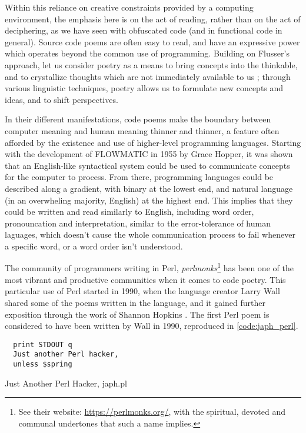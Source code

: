 Within this reliance on creative constraints provided by a computing environment, the emphasis here is on the act of reading, rather than on the act of deciphering, as we have seen with obfuscated code (and in functional code in general). Source code poems are often easy to read, and have an expressive power which operates beyond the common use of programming. Building on Flusser's approach, let us consider poetry as a means to bring concepts into the thinkable, and to crystallize thoughts which are not immediately available to us \citep{flusser_doubt_2014}; through various linguistic techniques, poetry allows us to formulate new concepts and ideas, and to shift perspectives.

In their different manifestations, code poems make the boundary between computer meaning and human meaning thinner and thinner, a feature often afforded by the existence and use of higher-level programming languages. Starting with the development of FLOWMATIC in 1955 by Grace Hopper, it was shown that an English-like syntactical system could be used to communicate concepts for the computer to process. From there, programming languages could be described along a gradient, with binary at the lowest end, and natural language (in an overwheling majority, English) at the highest end. This implies that they could be written and read similarly to English, including word order, pronouncation and interpretation, similar to the error-tolerance of human laguages, which doesn't cause the whole communication process to fail whenever a specific word, or a word order isn't understood.

The community of programmers writing in Perl, \emph{perlmonks}\footnote{See their website: \url{https://perlmonks.org/}, with the spiritual, devoted and communal undertones that such a name implies.} has been one of the most vibrant and productive communities when it comes to code poetry. This particular use of Perl started in 1990, when the language creator Larry Wall shared some of the poems written in the language, and it gained further exposition through the work of Shannon Hopkins \citep{hopkins_camels_1992}. The first Perl poem is considered to have been written by Wall in 1990, reproduced in \ref{code:japh_perl}.

\begin{listing}
  \begin{verbatim}
  print STDOUT q
  Just another Perl hacker,
  unless $spring
\end{verbatim}
  \caption{Just Another Perl Hacker, japh.pl}
  \label{code:japh_perl}
\end{listing}

